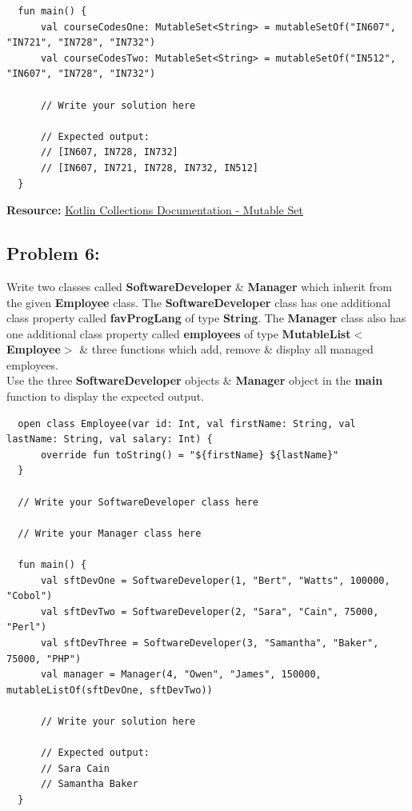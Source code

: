 \documentclass{article}
\begin{document}
\begin{verbatim}
  fun main() {
      val courseCodesOne: MutableSet<String> = mutableSetOf("IN607", "IN721", "IN728", "IN732")
      val courseCodesTwo: MutableSet<String> = mutableSetOf("IN512", "IN607", "IN728", "IN732")

      // Write your solution here

      // Expected output:
      // [IN607, IN728, IN732]
      // [IN607, IN721, IN728, IN732, IN512] 
  }
\end{verbatim}

\textbf{Resource:} \href{https://kotlinlang.org/api/latest/jvm/stdlib/kotlin.collections/-mutable-set/}{Kotlin Collections Documentation - Mutable Set}

\subsection*{Problem 6:} 
Write two classes called \textbf{SoftwareDeveloper} \& \textbf{Manager} which inherit from the given \textbf{Employee} class. The \textbf{SoftwareDeveloper} class has one additional class property called \textbf{favProgLang} of type \textbf{String}. The \textbf{Manager} class also has one additional class property called \textbf{employees} of type \textbf{MutableList$<$Employee$>$} \& three functions which add, remove \& display all managed employees. \\

Use the three \textbf{SoftwareDeveloper} objects \& \textbf{Manager} object in the \textbf{main} function to display the expected output.

\begin{verbatim}
  open class Employee(var id: Int, val firstName: String, val lastName: String, val salary: Int) {
      override fun toString() = "${firstName} ${lastName}"
  }

  // Write your SoftwareDeveloper class here

  // Write your Manager class here

  fun main() {
      val sftDevOne = SoftwareDeveloper(1, "Bert", "Watts", 100000, "Cobol")
      val sftDevTwo = SoftwareDeveloper(2, "Sara", "Cain", 75000, "Perl")
      val sftDevThree = SoftwareDeveloper(3, "Samantha", "Baker", 75000, "PHP")
      val manager = Manager(4, "Owen", "James", 150000, mutableListOf(sftDevOne, sftDevTwo))

      // Write your solution here

      // Expected output:
      // Sara Cain
      // Samantha Baker
  }
\end{verbatim}
\end{document}
